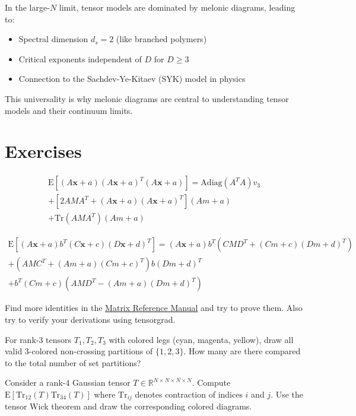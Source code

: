In the large-$N$ limit, tensor models are dominated by melonic diagrams, leading to:
\begin{itemize}
\item Spectral dimension $d_s = 2$ (like branched polymers)
\item Critical exponents independent of $D$ for $D \geq 3$
\item Connection to the Sachdev-Ye-Kitaev (SYK) model in physics
\end{itemize}

This universality is why melonic diagrams are central to understanding tensor models and their continuum limits.

\section{Exercises}
\begin{exercise}
   \begin{align*}
   \mathrm{E}[(A\mathbf{x} + a)(A\mathbf{x} + a)^T (A\mathbf{x} + a)] = 
   \mathrm{Adiag}(A^T A) v_3 \\
   + [2 AMA^T + (A\mathbf{x} + a)(A\mathbf{x} + a)^T] (Am + a) \\
   + \mathrm{Tr}(AMA^T)(Am + a)
   \end{align*}

   \begin{align*}
   \mathrm{E}[(A\mathbf{x} + a) b^T (C\mathbf{x} + c)(D\mathbf{x} + d)^T] = 
   (A\mathbf{x} + a) b^T (CMD^T + (Cm + c)(Dm + d)^T) \\
   + (AMC^T + (Am + a)(Cm + c)^T) b(Dm + d)^T \\
   + b^T (Cm + c)(AMD^T - (Am + a)(Dm + d)^T)
   \end{align*}
\end{exercise}
\begin{exercise}
   Find more identities in the \href{http://www.ee.ic.ac.uk/hp/staff/dmb/matrix/expect.html}{Matrix Reference Manual} and try to prove them.
   Also try to verify your derivations using tensorgrad.
\end{exercise}
\begin{exercise}
   For rank-3 tensors $T_1, T_2, T_3$ with colored legs (cyan, magenta, yellow), draw all valid 3-colored non-crossing partitions of $\{1,2,3\}$. 
   How many are there compared to the total number of set partitions?
\end{exercise}
\begin{exercise}
   Consider a rank-4 Gaussian tensor $T \in \mathbb{R}^{N \times N \times N \times N}$. 
   Compute $\mathrm{E}[\mathrm{Tr}_{12}(T) \mathrm{Tr}_{34}(T)]$ where $\mathrm{Tr}_{ij}$ denotes contraction of indices $i$ and $j$.
   Use the tensor Wick theorem and draw the corresponding colored diagrams.
\end{exercise}

